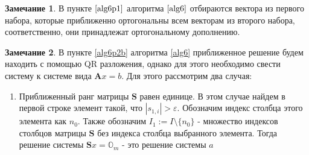 \documentclass[specialist, substylefile = spbureport.rtx, subf,href,colorlinks=true, 12pt]{disser}
\theoremstyle{definition}
\newtheorem{remark}{Замечание}
\begin{document}
\begin{remark}
    В пункте $\ref{alg6p1}$ алгоритма $\ref{alg6}$ отбираются вектора из первого набора, которые приближенно ортогональны всем векторам из второго набора, соответственно, они принадлежат ортогональному дополнению.
\end{remark}

\begin{remark}
    В пункте \ref{alg6p2b} алгоритма \ref{alg6} приближенное решение будем находить с помощью QR разложения, однако для этого необходимо свести систему к системе вида $\mathbf{A}x=b$. Для этого рассмотрим два случая:
    \begin{enumerate}
        \item Приближенный ранг матрицы $\mathbf{S}$ равен единице. В этом случае найдем в первой строке элемент такой, что $|s_{1, i}| > \varepsilon$. Обозначим индекс столбца этого элемента как $n_0$. Также обозначим $I_1:=I \setminus \{ n_0 \}$ - множество индексов столбцов матрицы $\mathbf{S}$ без индекса столбца выбранного элемента. Тогда решение системы $\mathbf{S}x=\mathds{O}_m$ - это решение системы $a$
    \end{enumerate}
\end{remark}


\end{document}
